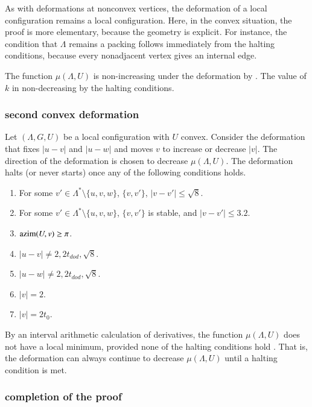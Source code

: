 As with deformations at nonconvex vertices, 
the deformation of a local
configuration remains a local configuration.  Here, in the
convex situation, the proof is more elementary, because the
geometry is explicit.  For instance, the condition that
$\Lambda$ remains a packing follows immediately from the halting
conditions, because every nonadjacent vertex gives an internal
edge.

The function $\mu(\Lambda,U)$ is non-increasing under the
deformation by \cite[Lemma~7.8]{arx}.  The value of
$k$ in non-decreasing by the halting conditions. 

\subsubsection{second convex deformation}

Let $(\Lambda,G,U)$ be a local configuration with $U$ convex.
Consider the deformation that fixes $|u-v|$ and $|u-w|$ and
moves $v$ to increase or decrease $|v|$.  The direction
of the deformation is chosen to decrease $\mu(\Lambda,U)$.
The deformation halts (or never starts) once any
of the following conditions holds.
\begin{enumerate}\label{e:halt-convex2}
\item For some $v'\in\Lambda^*\setminus\{u,v,w\}$, 
$\{v,v'\}$, $|v-v'|\le \sqrt8$.
\item For some $v'\in\Lambda^*\setminus\{u,v,w\}$,
$\{v,v'\}$ is  stable, and $|v-v'|\le 3.2$.
\item ${\operatorname{azim}}(U,v)\ge\pi$.
\item $|u-v|\ne 2,2t_{dod},\sqrt8$.
\item $|u-w|\ne 2,2t_{dod},\sqrt8$.
\item $|v|=2$.
\item $|v|=2t_0$.
\end{enumerate}

By an interval arithmetic calculation of derivatives,
the function $\mu(\Lambda,U)$ does not have a local
minimum, provided none of the halting conditions hold
\cite[Lemma~7.10]{arx}.  That is, the deformation can always continue
to decrease $\mu(\Lambda,U)$ until a halting condition is met.



\subsubsection{completion of the proof}


